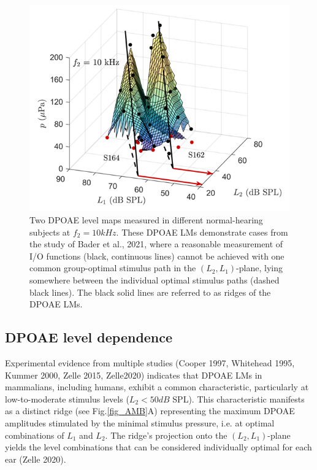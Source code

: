 \documentclass[journal,twoside,web]{ieeecolor2}
\begin{document}
\begin{figure}[ht]
\centerline{\includegraphics[width=\columnwidth]{Fig_0_v1.png}}
\caption{Two DPOAE level maps measured in different normal-hearing subjects at $f_2 = 10 kHz$.
These DPOAE LMs demonstrate cases from the study of Bader et al., 2021, where a reasonable measurement of I/O functions (black, continuous lines) cannot be achieved with one common group-optimal stimulus path in the $(L_2, L_1)$-plane, lying somewhere between the individual optimal stimulus paths (dashed black lines).
The black solid lines are referred to as ridges of the DPOAE LMs.}
\label{fig_Bdr}
\end{figure}

\subsection{DPOAE level dependence}
Experimental evidence from multiple studies (Cooper 1997, Whitehead 1995, Kummer 2000, Zelle 2015, Zelle2020) indicates that DPOAE LMs in mammalians, including humans, exhibit a common characteristic, particularly at low-to-moderate stimulus levels ($L_2<50 dB$ SPL).
This characteristic manifests as a distinct ridge (see Fig.\ref{fig_AMB}A) representing the maximum DPOAE amplitudes stimulated by the minimal stimulus pressure, i.e. at optimal combinations of $L_1$ and $L_2$.
The ridge’s projection onto the $(L_2, L_1)$-plane yields the level combinations that can be considered individually optimal for each ear (Zelle 2020).
 
\end{document}

